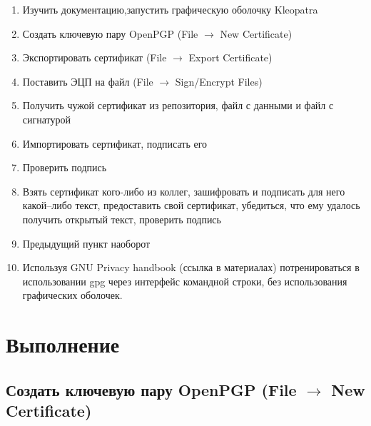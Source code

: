 \documentclass[utf8x, 12pt]{G7-32}
\begin{document}
\begin{enumerate}
	\item Изучить документацию,запустить графическую оболочку Kleopatra
	\item Создать ключевую пару OpenPGP (File $\rightarrow$ New Certificate)
	\item Экспортировать сертификат (File $\rightarrow$ Export Certificate)
	\item Поставить ЭЦП на файл (File $\rightarrow$ Sign/Encrypt Files)
	\item Получить чужой сертификат из репозитория, файл с данными и файл с сигнатурой
	\item Импортировать сертификат, подписать его
	\item Проверить подпись
	\item Взять сертификат кого-либо из коллег, зашифровать и подписать для него какой--либо текст, предоставить свой сертификат, убедиться, что ему удалось получить открытый текст, проверить подпись
	\item Предыдущий пункт наоборот
	\item Используя GNU Privacy handbook (ссылка в материалах) потренироваться в использовании gpg через интерфейс командной строки, без использования графических оболочек.
\end{enumerate}


\chapter{Выполнение}

\section{Создать ключевую пару OpenPGP (File $\rightarrow$ New Certificate)}
\end{document}
